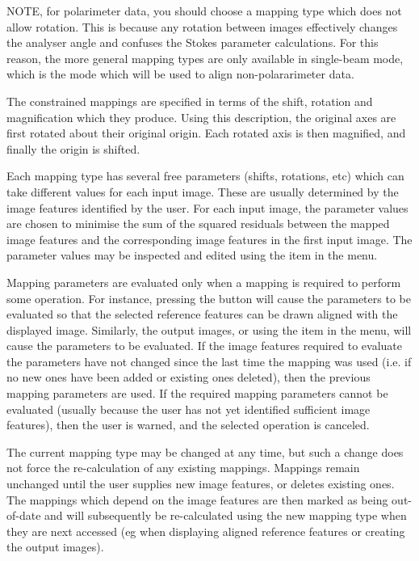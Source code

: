 NOTE, for polarimeter data, you should choose a mapping type which does
not allow rotation. This is because any rotation between images
effectively changes the analyser angle and confuses the Stokes parameter
calculations. For this reason, the more general mapping types are only
available in single-beam mode, which is the mode which will be used to
align non-polararimeter data.

The constrained mappings are specified in terms of the shift, rotation and
magnification which they produce. Using this description, the original
axes are first rotated about their original origin. Each rotated axis is 
then magnified, and finally the origin is shifted.

Each mapping type has several free parameters (shifts, rotations, etc)
which can take different values for each input image. These are usually
determined by the image features identified by the user. For each input
image, the parameter values are chosen to minimise the sum of the squared
residuals between the mapped image features and the corresponding image
features in the first input image. The parameter values may be inspected
and edited using the  item
in the  menu.

Mapping parameters are evaluated only when a mapping is required to
perform some operation. For instance, pressing the  button will cause the parameters to be
evaluated so that the selected reference features can be drawn
aligned with the displayed image. Similarly,  
the output images, or using the 
item in the  menu, will cause the
parameters to be evaluated. If the image features required to evaluate
the parameters have not changed since the last time the mapping was used
(i.e. if no new ones have been added or existing ones deleted), then the
previous mapping parameters are used. If the required mapping parameters 
cannot be evaluated (usually because the user has not yet identified
sufficient image features), then the user is warned, and the selected
operation is canceled.

The current mapping type may be changed at any time, but such a change
does not force the re-calculation of any existing mappings. Mappings
remain unchanged until the user supplies new image features, or deletes
existing ones. The mappings which depend on the image features are then
marked as being out-of-date and will subsequently be re-calculated using
the new mapping type when they are next accessed (eg when displaying
aligned reference features or creating the output images).

